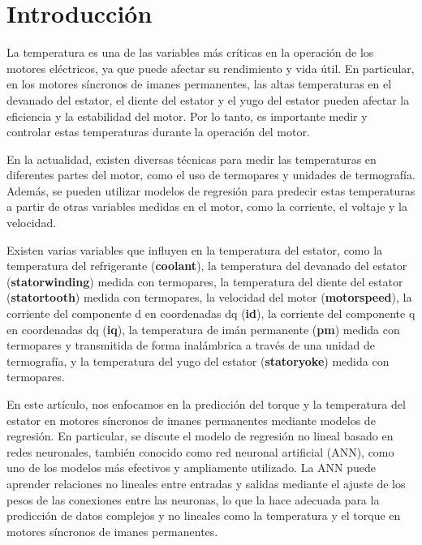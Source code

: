 \documentclass{article}
\begin{document}
\section{Introducción}
\setlength{\parskip}{10pt}

La temperatura es una de las variables más críticas en la operación de los motores eléctricos, ya que puede afectar su rendimiento y vida útil. En particular, en los motores síncronos de imanes permanentes, las altas temperaturas en el devanado del estator, el diente del estator y el yugo del estator pueden afectar la eficiencia y la estabilidad del motor. Por lo tanto, es importante medir y controlar estas temperaturas durante la operación del motor.

En la actualidad, existen diversas técnicas para medir las temperaturas en diferentes partes del motor, como el uso de termopares y unidades de termografía. Además, se pueden utilizar modelos de regresión para predecir estas temperaturas a partir de otras variables medidas en el motor, como la corriente, el voltaje y la velocidad.

Existen varias variables que influyen en la temperatura del estator, como la temperatura del refrigerante (\textbf{coolant}), la temperatura del devanado del estator (\textbf{stator\textunderscore winding}) medida con termopares, la temperatura del diente del estator (\textbf{stator\textunderscore tooth}) medida con termopares, la velocidad del motor (\textbf{motor\textunderscore speed}), la corriente del componente d en coordenadas dq (\textbf{i\textunderscore d}), la corriente del componente q en coordenadas dq (\textbf{i\textunderscore q}), la temperatura de imán permanente (\textbf{pm}) medida con termopares y transmitida de forma inalámbrica a través de una unidad de termografía, y la temperatura del yugo del estator (\textbf{stator\textunderscore yoke}) medida con termopares.


En este artículo, nos enfocamos en la predicción del torque y la temperatura del estator en motores síncronos de imanes permanentes mediante modelos de regresión. En particular, se discute el modelo de regresión no lineal basado en redes neuronales, también conocido como red neuronal artificial (ANN), como uno de los modelos más efectivos y ampliamente utilizado. La ANN puede aprender relaciones no lineales entre entradas y salidas mediante el ajuste de los pesos de las conexiones entre las neuronas, lo que la hace adecuada para la predicción de datos complejos y no lineales como la temperatura y el torque en motores síncronos de imanes permanentes.
\end{document}
